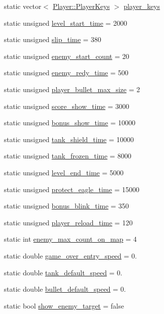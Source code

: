 \begin{DoxyCompactItemize}
\item 
static vector$<$ \hyperlink{struct_player_1_1_player_keys}{Player\+::\+Player\+Keys} $>$ \hyperlink{class_app_config_a8e37a09b8c71975463adcb2c20772021}{player\+\_\+keys}
\item 
static unsigned \hyperlink{class_app_config_a2c87bbaa3d4140b5aad70f8b62c012bd}{level\+\_\+start\+\_\+time} = 2000
\item 
static unsigned \hyperlink{class_app_config_a607f43c11d16d60415e59d9af744865b}{slip\+\_\+time} = 380
\item 
static unsigned \hyperlink{class_app_config_a70c6740393da27baf8d67137eafc0817}{enemy\+\_\+start\+\_\+count} = 20
\item 
static unsigned \hyperlink{class_app_config_a64c3cd6cd3e16b336f6577e4618fafa6}{enemy\+\_\+redy\+\_\+time} = 500
\item 
static unsigned \hyperlink{class_app_config_a31d367b3754781a3559b38da0c6e5a43}{player\+\_\+bullet\+\_\+max\+\_\+size} = 2
\item 
static unsigned \hyperlink{class_app_config_a126c2521d99678ca21d8c83ae41808fb}{score\+\_\+show\+\_\+time} = 3000
\item 
static unsigned \hyperlink{class_app_config_a25af1c0e6ab7d46215b6dea68f65ff65}{bonus\+\_\+show\+\_\+time} = 10000
\item 
static unsigned \hyperlink{class_app_config_a65eb52c4705dd9f24ac32c80526b0726}{tank\+\_\+shield\+\_\+time} = 10000
\item 
static unsigned \hyperlink{class_app_config_a1a81d61ebe8ff5538a824fcf685c0e10}{tank\+\_\+frozen\+\_\+time} = 8000
\item 
static unsigned \hyperlink{class_app_config_a458fbb29529e514869a57cd494a60aa6}{level\+\_\+end\+\_\+time} = 5000
\item 
static unsigned \hyperlink{class_app_config_a208cb555bfc7a1945334368c0aba081e}{protect\+\_\+eagle\+\_\+time} = 15000
\item 
static unsigned \hyperlink{class_app_config_a39d9ef6ce22c6ec46fe693a8d96e6d5c}{bonus\+\_\+blink\+\_\+time} = 350
\item 
static unsigned \hyperlink{class_app_config_a623d06a5d3749f2f4177b9017b54fd9d}{player\+\_\+reload\+\_\+time} = 120
\item 
static int \hyperlink{class_app_config_a2dd88164209eeb2717e5aaa50177c1bd}{enemy\+\_\+max\+\_\+count\+\_\+on\+\_\+map} = 4
\item 
static double \hyperlink{class_app_config_af1955c96963f2fc779004fcc7298c92c}{game\+\_\+over\+\_\+entry\+\_\+speed} = 0.
\item 
static double \hyperlink{class_app_config_a7f52e49c897ef576443e8e0f177aa0a7}{tank\+\_\+default\+\_\+speed} = 0.
\item 
static double \hyperlink{class_app_config_a1e4b88ab661bf3406c72f1c8b65e7603}{bullet\+\_\+default\+\_\+speed} = 0.
\item 
static bool \hyperlink{class_app_config_a9ebca92d71f6aa8b351f675db12d2c80}{show\+\_\+enemy\+\_\+target} = false
\end{DoxyCompactItemize}


